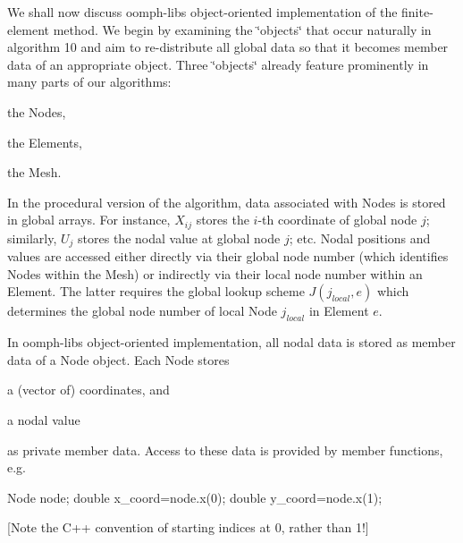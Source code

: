 We shall now discuss {\ttfamily oomph-\/lib\textquotesingle{}s} object-\/oriented implementation of the finite-\/element method. We begin by examining the \char`\"{}objects\char`\"{} that occur naturally in algorithm 10 and aim to re-\/distribute all global data so that it becomes member data of an appropriate object. Three \char`\"{}objects\char`\"{} already feature prominently in many parts of our algorithms\+:
\begin{DoxyItemize}
\item the Nodes,
\item the Elements,
\item the Mesh.
\end{DoxyItemize}

In the procedural version of the algorithm, data associated with Nodes is stored in global arrays. For instance, $ X_{ij}$ stores the $i$-\/th coordinate of global node $ j $; similarly, $ U_{j} $ stores the nodal value at global node $j$; etc. Nodal positions and values are accessed either directly via their global node number (which identifies Nodes within the Mesh) or indirectly via their local node number within an Element. The latter requires the global lookup scheme $ J(j_{local},e)$ which determines the global node number of local Node $j_{local}$ in Element $e$.

In {\ttfamily oomph-\/lib\textquotesingle{}s} object-\/oriented implementation, all nodal data is stored as member data of a Node object. Each Node stores
\begin{DoxyItemize}
\item a (vector of) coordinates, and
\item a nodal value
\end{DoxyItemize}as private member data. Access to these data is provided by member functions, e.\+g. 
\begin{DoxyCode}
Node node;
\textcolor{keywordtype}{double} x\_coord=node.x(0);
\textcolor{keywordtype}{double} y\_coord=node.x(1);
\end{DoxyCode}


\mbox{[}Note the C++ convention of starting indices at 0, rather than 1!\mbox{]}

